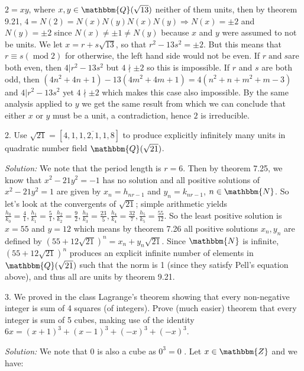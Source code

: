 \documentclass{letter}
\newcommand{\tmem}[1]{{\em #1\/}}
\newcommand{\tmop}[1]{\ensuremath{\operatorname{#1}}}
\begin{document}
$2 = x y$, where $x, y \in \mathbbm{Q}( \sqrt{13})$ neither of them units,
then by theorem 9.21, $4 = N (2) = N (x) N (y) N (x) N (y) \Rightarrow N (x) =
\pm 2$ and $N (y) = \pm 2$ since $N (x) \neq \pm 1 \neq N (y)$ because $x$ and
$y$ were assumed to not be units. We let $x = r + s \sqrt{13}$, so that $r^2 -
13 s^2 = \pm 2$. But this means that $r \equiv s (\tmop{mod} 2)$ for
otherwise, the left hand side would not be even. If $r \tmop{and} s$are both
even, then $4 | r^2 - 13 s^2$ but $4 \nmid \pm 2$ so this is impossible. If
$r$ and $s$ are both odd, then $(4 n^2 + 4 n + 1) - 13 (4 m^2 + 4 m + 1) = 4
(n^2 + n + m^2 + m - 3)$ and $4 | r^2 - 13 s^2$ yet $4 \nmid \pm 2$ which
makes this case also impossible. By the same analysis applied to $y$ we get
the same result from which we can conclude that either $x$ or $y$ must be a
unit, a contradiction, hence $2$ is irreducible.

2. Use $\sqrt{21} = [4, \overline{1, 1, 2, 1, 1, 8}]$ to produce explicitly
infinitely many units in quadratic number field $\mathbbm{Q}( \sqrt{21})$.

{\tmem{Solution:}} We note that the period length is $r = 6$. Then by theorem
7.25, we know that $x^2 - 21 y^2 = - 1$ has no solution and all positive
solutions of $x^2 - 21 y^2 = 1$ are given by $x_n = h_{n r - 1}$ and $y_n =
k_{n r - 1}$, $n \in \mathbbm{N}$. So let's look at the convergents of
$\sqrt{21}$; simple arithmetic yields $\frac{h_0}{k_0} = \frac{4}{1},
\frac{h_1}{k_1} = \frac{5}{1}, \frac{h_2}{k_2} = \frac{9}{2}, \frac{h_3}{k_3}
= \frac{23}{5}, \frac{h_4}{k_4} = \frac{32}{7}, \frac{h_5}{k_5} =
\frac{55}{12}$. So the least positive solution is $x = 55$ and $y = 12$ which
means by theorem 7.26 all positive solutions $x_n, y_n$ are defined by $(55 +
12 \sqrt{21})^n = x_n + y_n \sqrt{21}$. Since $\mathbbm{N}$ is infinite, $(55
+ 12 \sqrt{21})^n$ produces an explicit infinite number of elements in
$\mathbbm{Q}( \sqrt{21})$ such that the norm is 1 (since they satisfy Pell's
equation above), and thus all are units by theorem 9.21.

\newpage

3. We proved in the class Lagrange's theorem showing that every non-negative
integer is sum of 4 squares (of integers). Prove (much easier) theorem that
every integer is sum of 5 cubes, making use of the identity $6 x = (x + 1)^3 +
(x - 1)^3 + (- x)^3 + (- x)^3$.

{\tmem{Solution:}} We note that $0$ is also a cube as $0^3 = 0$ . Let $x \in
\mathbbm{Z}$ and we have:
\end{document}
